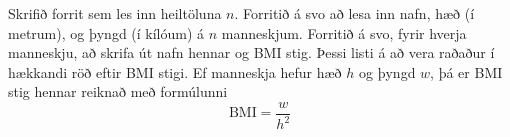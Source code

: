 \begin{problem}
	Skrifið forrit sem les inn heiltöluna $n$. Forritið á svo að lesa inn nafn, hæð (í metrum), og þyngd (í kílóum) á $n$ manneskjum. Forritið á svo, fyrir hverja manneskju, að skrifa út nafn hennar og BMI stig. Þessi listi á að vera raðaður í hækkandi röð eftir BMI stigi. Ef manneskja hefur hæð $h$ og þyngd $w$, þá er BMI stig hennar reiknað með formúlunni
	\[
		\mathrm{BMI} = \frac{w}{h^2}
	\]

\begin{example}
%
\end{example}
\end{problem}
